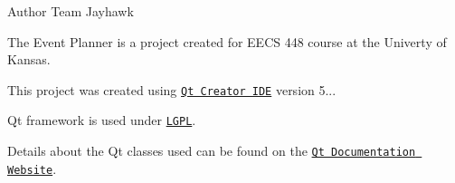 \begin{DoxyAuthor}{Author}
Team Jayhawk
\end{DoxyAuthor}
The Event Planner is a project created for E\+E\+CS 448 course at the Univerty of Kansas.

This project was created using \href{https://www.qt.io/qt-features-libraries-apis-tools-and-ide/}{\tt Qt Creator I\+DE} version 5...

Qt framework is used under \href{https://www.gnu.org/licenses/lgpl.txt}{\tt L\+G\+PL}.

Details about the Qt classes used can be found on the \href{http://doc.qt.io/qt-5/classes.html}{\tt Qt Documentation Website}. 